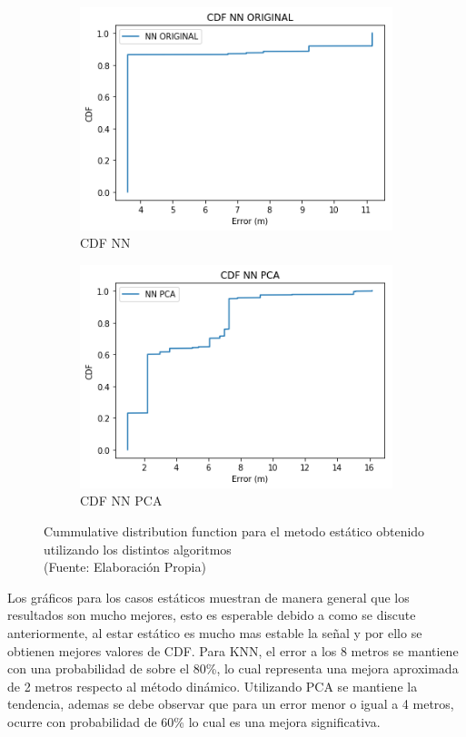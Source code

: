 \begin{figure}[ht!]
\begin{subfigure}{.5\textwidth}
  \centering
  \includegraphics[width=.8\linewidth]{figures/cdf-nn-estatico.png}
  \caption{CDF NN}
  \label{fig:sub1}
\end{subfigure}%
\begin{subfigure}{.5\textwidth}
  \centering
  \includegraphics[width=.8\linewidth]{figures/cdf-nnPCA-estatico.png}
  \caption{CDF NN PCA}
  \label{fig:sub2}
\end{subfigure}
\caption[abs]{Cummulative distribution function para el metodo estático obtenido utilizando los distintos algoritmos \\
{\scriptsize (Fuente: Elaboración Propia)}}
\label{fig:cdf-estaticos}
\end{figure}

Los gráficos para los casos estáticos muestran de manera general que los resultados son mucho mejores, esto es esperable debido a como se discute anteriormente, al estar estático es mucho mas estable la señal y por ello se obtienen mejores valores de CDF. Para KNN, el error a los 8 metros se mantiene con una probabilidad de sobre el 80\%, lo cual representa una mejora aproximada de 2 metros respecto al método dinámico. Utilizando PCA se mantiene la tendencia, ademas se debe observar que para un error menor o igual a 4 metros, ocurre con probabilidad de 60\% lo cual es una mejora significativa.

